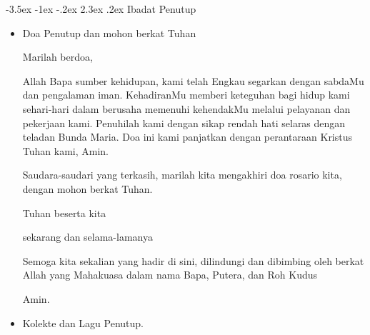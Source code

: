 \documentclass[a5paper,titlepage,12pt]{scrbook}
\makeatletter
\renewcommand{\section}{\@startsection {section}{1}{\z@}%
                                   {-3.5ex \@plus -1ex \@minus -.2ex}%
                                   {2.3ex \@plus.2ex}%
                                   {\normalfont\normalsize\bfseries}}
\makeatother
\begin{document}
\section{Ibadat Penutup}
\begin{itemize}
\item Doa Penutup dan mohon berkat Tuhan

	Marilah berdoa,

Allah Bapa sumber kehidupan, kami telah Engkau segarkan dengan sabdaMu dan pengalaman iman. KehadiranMu memberi keteguhan bagi hidup kami sehari-hari dalam berusaha memenuhi kehendakMu melalui pelayanan dan  pekerjaan kami. Penuhilah kami dengan sikap rendah hati selaras dengan teladan Bunda Maria. Doa ini kami panjatkan dengan perantaraan Kristus Tuhan kami, Amin.

Saudara-saudari yang terkasih, marilah kita mengakhiri doa rosario kita, dengan mohon berkat Tuhan.

Tuhan beserta kita

sekarang dan selama-lamanya

Semoga kita sekalian yang hadir di sini, dilindungi dan dibimbing oleh berkat Allah yang Mahakuasa dalam nama Bapa, Putera, dan Roh Kudus

Amin.

\item Kolekte dan Lagu Penutup. 
\end{itemize}
\end{document}
